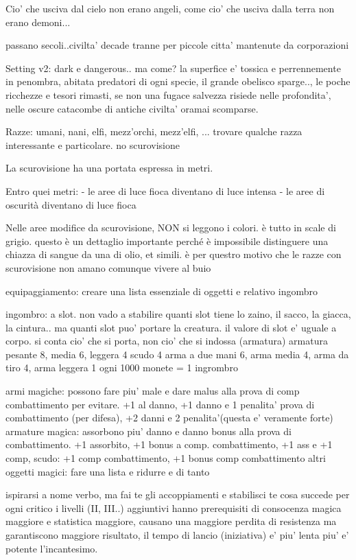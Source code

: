 \documentclass[12pt,a4paper,twoside,openany]{book}
\begin{document}
Cio' che usciva dal cielo non erano angeli, come cio' che usciva dalla terra non erano demoni...

passano secoli..civilta' decade tranne per piccole citta' mantenute da corporazioni


Setting v2: dark e dangerous.. ma come?
la superfice e'  tossica e perrennemente in penombra, abitata predatori di ogni specie, il grande obelisco sparge.., le poche ricchezze e tesori rimasti, se non una fugace salvezza risiede nelle profondita', nelle oscure catacombe di antiche civilta' oramai scomparse.


Razze: umani, nani, elfi, mezz'orchi, mezz'elfi, ... trovare qualche razza interessante e particolare. no scurovisione  

La scurovisione ha una portata espressa in metri. 

Entro quei metri: 
- le aree di luce fioca diventano di luce intensa
- le aree di oscurità diventano di luce fioca

Nelle aree modifice da scurovisione, NON si leggono i colori.  è tutto in scale di grigio. questo è un dettaglio importante perché è impossibile distinguere una chiazza di sangue da una di olio, et simili. è per questro motivo che le razze con scurovisione non amano comunque vivere al buio

equipaggiamento: creare una lista essenziale di oggetti e relativo ingombro

ingombro: a slot. non vado a stabilire quanti slot tiene lo zaino, il sacco, la giacca, la cintura.. ma quanti slot puo' portare la creatura. il valore di slot e' uguale a corpo. si conta cio' che si porta, non cio' che si indossa (armatura)
armatura pesante 8, media 6, leggera 4
scudo 4
arma a due mani 6, arma media 4, arma da tiro 4, arma leggera 1
ogni 1000 monete = 1 ingrombro

armi magiche: possono fare piu' male e dare malus alla prova di comp combattimento per evitare. +1 al danno, +1 danno e 1 penalita' prova di combattimento (per difesa), +2 danni e 2 penalita'(questa e' veramente forte)
armature magica: assorbono piu' danno e danno bonus alla prova di combattimento. +1 assorbito, +1 bonus a comp. combattimento, +1 ass e +1 comp, 
scudo: +1 comp combattimento, +1 bonus comp combattimento
altri oggetti magici: fare una lista e ridurre e di tanto


ispirarsi a nome verbo, ma fai te gli accoppiamenti e stabilisci te cosa succede per ogni critico 
i livelli (II, III..) aggiuntivi hanno prerequisiti di consocenza magica maggiore e statistica maggiore, causano una maggiore perdita di resistenza ma garantiscono maggiore risultato, il tempo di lancio (iniziativa) e' piu' lenta piu' e' potente l'incantesimo.
\end{document}
